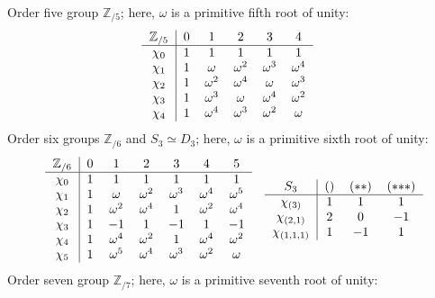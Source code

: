 \pan Order five group $\mathbb{Z}_{/5}$; here, $\omega$ is a primitive fifth root of unity:
\begin{align*}
  & \begin{tabular}{c|ccccc}
    $\mathbb{Z}_{/5}$ & $0$ & $1$ & $2$ & $3$ & $4$ \\
    \hline
    $\chi_{0}$ & $1$ & $1$ & $1$ & $1$ & $1$ \\
    $\chi_{1}$ & $1$ & $\omega$ & $\omega^2$ & $\omega^3$ & $\omega^4$ \\
    $\chi_{2}$ & $1$ & $\omega^2$ & $\omega^4$ & $\omega$ & $\omega^3$ \\
    $\chi_{3}$ & $1$ & $\omega^3$ & $\omega$ & $\omega^4$ & $\omega^2$ \\
    $\chi_{4}$ & $1$ & $\omega^4$ & $\omega^3$ & $\omega^2$ & $\omega$ \\
  \end{tabular}
\end{align*}
\pan Order six groups $\mathbb{Z}_{/6}$ and $S_3 \simeq D_3$; here, $\omega$ is a primitive sixth root of unity:
\begin{align*}
  & \begin{tabular}{c|cccccc}
    $\mathbb{Z}_{/6}$ & $0$ & $1$ & $2$ & $3$ & $4$ & $5$ \\
    \hline
    $\chi_{0}$ & $1$ & $1$ & $1$ & $1$ & $1$ & $1$ \\
    $\chi_{1}$ & $1$ & $\omega$ & $\omega^2$ & $\omega^3$ & $\omega^4$ & $\omega^5$ \\
    $\chi_{2}$ & $1$ & $\omega^2$ & $\omega^4$ & $1$ & $\omega^2$ & $\omega^4$ \\
    $\chi_{3}$ & $1$ & $-1$ & $1$ & $-1$ & $1$ & $-1$ \\
    $\chi_{4}$ & $1$ & $\omega^4$ & $\omega^2$ & $1$ & $\omega^4$ & $\omega^2$ \\
    $\chi_{5}$ & $1$ & $\omega^5$ & $\omega^4$ & $\omega^3$ & $\omega^2$ & $\omega$ \\
  \end{tabular}
  & \begin{tabular}{c|cccccc}
    $S_3$ & $()$ & $({*}{*})$ & $({*}{*}{*})$ \\
    \hline
    $\chi_{(3)}$ & $1$ & $1$ & $1$ \\
    $\chi_{(2, 1)}$ & $2$ & $0$ & $-1$ \\
    $\chi_{(1, 1, 1)}$ & $1$ & $-1$ & $1$ \\
  \end{tabular}
\end{align*}
\pan Order seven group $\mathbb{Z}_{/7}$; here, $\omega$ is a primitive seventh root of unity:
